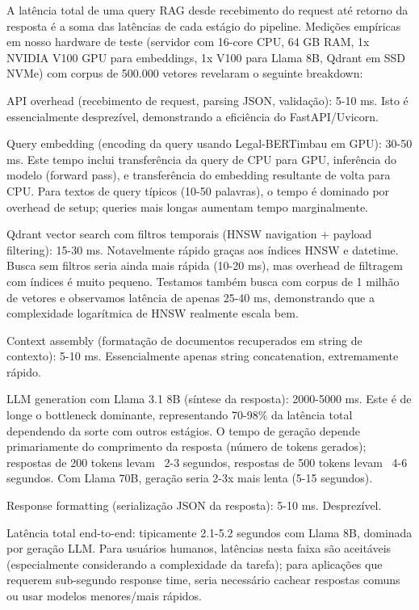 \documentclass[12pt,a4paper]{article}
\begin{document}
A latência total de uma query RAG desde recebimento do request até retorno da resposta é a soma das latências de cada estágio do pipeline. Medições empíricas em nosso hardware de teste (servidor com 16-core CPU, 64 GB RAM, 1x NVIDIA V100 GPU para embeddings, 1x V100 para Llama 8B, Qdrant em SSD NVMe) com corpus de 500.000 vetores revelaram o seguinte breakdown:

API overhead (recebimento de request, parsing JSON, validação): 5-10 ms. Isto é essencialmente desprezível, demonstrando a eficiência do FastAPI/Uvicorn.

Query embedding (encoding da query usando Legal-BERTimbau em GPU): 30-50 ms. Este tempo inclui transferência da query de CPU para GPU, inferência do modelo (forward pass), e transferência do embedding resultante de volta para CPU. Para textos de query típicos (10-50 palavras), o tempo é dominado por overhead de setup; queries mais longas aumentam tempo marginalmente.

Qdrant vector search com filtros temporais (HNSW navigation + payload filtering): 15-30 ms. Notavelmente rápido graças aos índices HNSW e datetime. Busca sem filtros seria ainda mais rápida (10-20 ms), mas overhead de filtragem com índices é muito pequeno. Testamos também busca com corpus de 1 milhão de vetores e observamos latência de apenas 25-40 ms, demonstrando que a complexidade logarítmica de HNSW realmente escala bem.

Context assembly (formatação de documentos recuperados em string de contexto): 5-10 ms. Essencialmente apenas string concatenation, extremamente rápido.

LLM generation com Llama 3.1 8B (síntese da resposta): 2000-5000 ms. Este é de longe o bottleneck dominante, representando 70-98\% da latência total dependendo da sorte com outros estágios. O tempo de geração depende primariamente do comprimento da resposta (número de tokens gerados); respostas de 200 tokens levam ~2-3 segundos, respostas de 500 tokens levam ~4-6 segundos. Com Llama 70B, geração seria 2-3x mais lenta (5-15 segundos).

Response formatting (serialização JSON da resposta): 5-10 ms. Desprezível.

Latência total end-to-end: tipicamente 2.1-5.2 segundos com Llama 8B, dominada por geração LLM. Para usuários humanos, latências nesta faixa são aceitáveis (especialmente considerando a complexidade da tarefa); para aplicações que requerem sub-segundo response time, seria necessário cachear respostas comuns ou usar modelos menores/mais rápidos.
\end{document}
